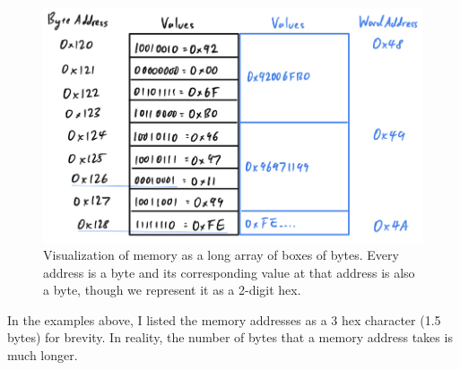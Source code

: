 \documentclass{article}
\begin{document}
\begin{definition}[Memory]
      \begin{figure}[H]
        \centering 
        \includegraphics[scale=0.4]{img/memory_visual_byte.png}
        \caption{Visualization of memory as a long array of boxes of bytes. Every address is a byte and its corresponding value at that address is also a byte, though we represent it as a 2-digit hex. } 
        \label{fig:memory_visual_byte}
      \end{figure}
    \end{definition}

    In the examples above, I listed the memory addresses as a 3 hex character (1.5 bytes) for brevity. In reality, the number of bytes that a memory address takes is much longer. 
\end{document}
